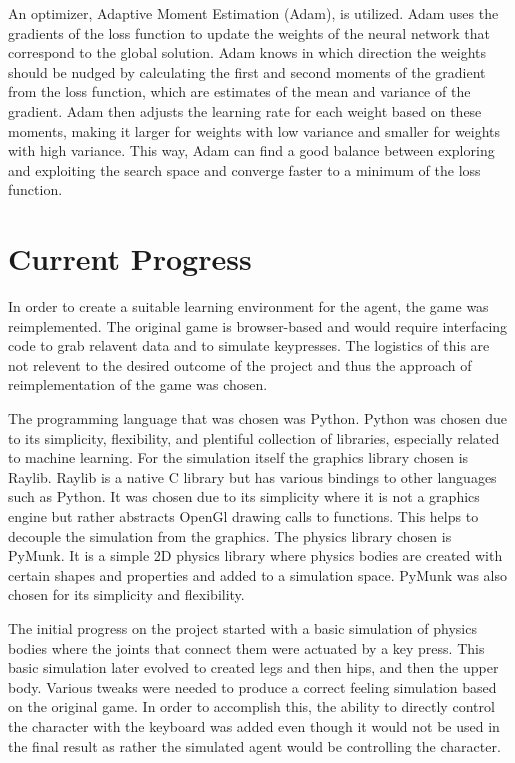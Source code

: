 \documentclass[letterpaper]{article} %
\begin{document}
\par An optimizer, Adaptive Moment Estimation (Adam), is utilized. Adam uses the gradients of the loss function to update the weights of the neural network that correspond to the global solution. Adam knows in which direction the weights should be nudged by calculating the first and second moments of the gradient from the loss function, which are estimates of the mean and variance of the gradient. Adam then adjusts the learning rate for each weight based on these moments, making it larger for weights with low variance and smaller for weights with high variance. This way, Adam can find a good balance between exploring and exploiting the search space and converge faster to a minimum of the loss function.

\section{Current Progress}
In order to create a suitable learning environment for the agent, the game was reimplemented. The original game is browser-based and would require interfacing code to grab relavent data and to simulate keypresses. The logistics of this are not relevent to the desired outcome of the project and thus the approach of reimplementation of the game was chosen.
\par The programming language that was chosen was Python. Python was chosen due to its simplicity, flexibility, and plentiful collection of libraries, especially related to machine learning. For the simulation itself the graphics library chosen is Raylib. Raylib is a native C library but has various bindings to other languages such as Python. It was chosen due to its simplicity where it is not a graphics engine but rather abstracts OpenGl drawing calls to functions. This helps to decouple the simulation from the graphics. The physics library chosen is PyMunk. It is a simple 2D physics library where physics bodies are created with certain shapes and properties and added to a simulation space. PyMunk was also chosen for its simplicity and flexibility.

\par The initial progress on the project started with a basic simulation of physics bodies where the joints that connect them were actuated by a key press. This basic simulation later evolved to created legs and then hips, and then the upper body. Various tweaks were needed to produce a correct feeling simulation based on the original game. In order to accomplish this, the ability to directly control the character with the keyboard was added even though it would not be used in the final result as rather the simulated agent would be controlling the character. 
\end{document}
